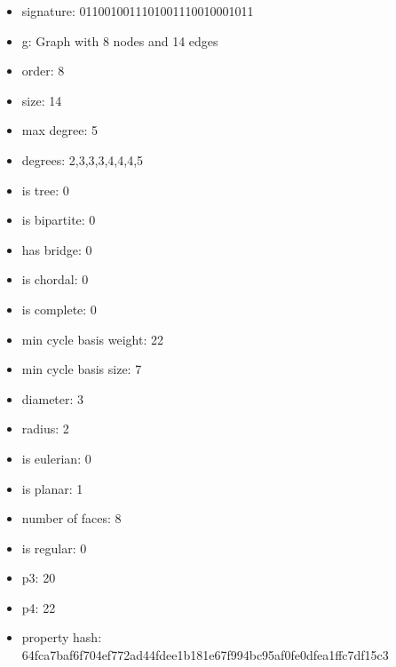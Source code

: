 \begin{itemize}
\item signature: 0110010011101001110010001011
\item g: Graph with 8 nodes and 14 edges
\item order: 8
\item size: 14
\item max degree: 5
\item degrees: 2,3,3,3,4,4,4,5
\item is tree: 0
\item is bipartite: 0
\item has bridge: 0
\item is chordal: 0
\item is complete: 0
\item min cycle basis weight: 22
\item min cycle basis size: 7
\item diameter: 3
\item radius: 2
\item is eulerian: 0
\item is planar: 1
\item number of faces: 8
\item is regular: 0
\item p3: 20
\item p4: 22
\item property hash: 64fca7baf6f704ef772ad44fdee1b181e67f994bc95af0fe0dfea1ffc7df15c3
\end{itemize}
\newpage
\begin{figure}
\end{figure}
